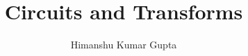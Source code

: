 \documentclass[journal,12pt,twocolumn]{IEEEtran}
\begin{document}
\makeatletter
{}
\makeatother
\let\StandardTheFigure\thefigure
\renewcommand{\thefigure}{\theproblem}
\def\putbox#1#2#3{\makebox[0in][l]{\makebox[#1][l]{}\raisebox{\baselineskip}[0in][0in]{\raisebox{#2}[0in][0in]{#3}}}}
     \def\rightbox#1{\makebox[0in][r]{#1}}
     \def\centbox#1{\makebox[0in]{#1}}
     \def\topbox#1{\raisebox{-\baselineskip}[0in][0in]{#1}}
     \def\midbox#1{\raisebox{-0.5\baselineskip}[0in][0in]{#1}}
\vspace{3cm}
\title{ 
Circuits and Transforms
}
%
%
%
\author{ Himanshu Kumar Gupta%
}
% 
%
\end{document}

